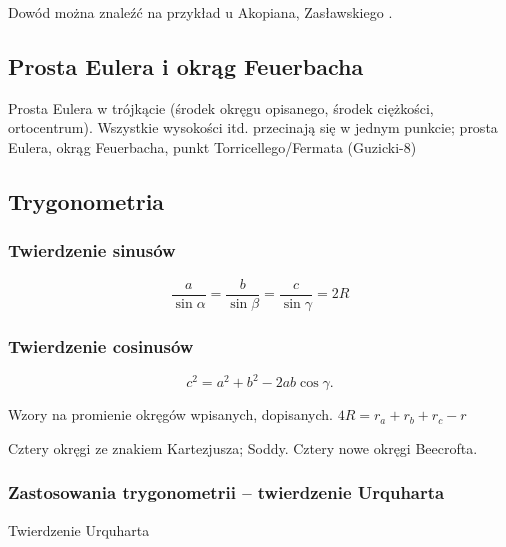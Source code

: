 Dowód można znaleźć na przykład u Akopiana, Zasławskiego \cite[s. 93, 61, 67, 115, 124]{akopyan_2007}.


\subsection{Prosta Eulera i okrąg Feuerbacha}
Prosta Eulera w trójkącie (środek okręgu opisanego, środek ciężkości, ortocentrum).
Wszystkie wysokości itd. przecinają się w jednym punkcie; prosta Eulera, okrąg Feuerbacha, punkt Torricellego/Fermata (Guzicki-8)


\subsection{Trygonometria}

\subsubsection{Twierdzenie sinusów}

$$\frac{a}{\sin \alpha} = \frac{b}{\sin \beta} = \frac{c}{\sin \gamma} = 2R$$

\subsubsection{Twierdzenie cosinusów}
\begin{proposition}
	\label{twierdzenie_cosinusow}%
	\begin{equation}
		c^2 = a^2 + b^2 - 2ab \cos \gamma.
	\end{equation}
\end{proposition}

%

Wzory na promienie okręgów wpisanych, dopisanych.
$4R = r_a + r_b + r_c - r$ %

Cztery okręgi ze znakiem Kartezjusza; Soddy.
Cztery nowe okręgi Beecrofta.


\subsubsection{Zastosowania trygonometrii -- twierdzenie Urquharta}
Twierdzenie Urquharta

